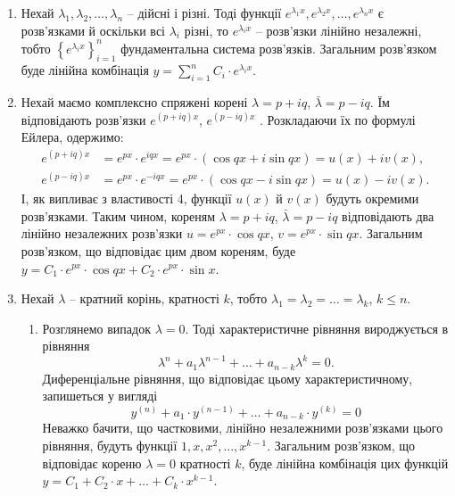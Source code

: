 \begin{enumerate}
\item Нехай $\lambda_1, \lambda_2, \ldots, \lambda_n$ -- дійсні і різні. Тоді функції $e^{\lambda_1 x}, e^{\lambda_2 x}, \ldots, e^{\lambda_n x}$ є розв’язками й оскільки всі $\lambda_i$ різні, то $e^{\lambda_i x}$ -- розв’язки лінійно незалежні, тобто $\left\{ e^{\lambda_i x} \right\}_{i = 1}^n$ фундаментальна система розв’язків. Загальним розв’язком буде лінійна комбінація $y = \sum_{i=1}^n C_i \cdot e^{\lambda_i x}$.
\item Нехай маємо комплексно спряжені корені $\lambda=p+iq$, $\bar\lambda=p-iq$. Їм відповідають розв’язки $e^{(p+iq)x}$, $e^{(p-iq)x}$ . Розкладаючи їх по формулі Ейлера, одержимо: 
\begin{align*}
	e^{(p+iq)x} &= e^{px} \cdot e^{iqx} = e^{px} \cdot (\cos qx + i \sin qx) = u(x) + i v(x), \\
	e^{(p-iq)x} &= e^{px} \cdot e^{-iqx} = e^{px} \cdot (\cos qx - i \sin qx) = u(x) - i v(x).
\end{align*}
І, як випливає з властивості 4, функції $u(x)$ й $v(x)$ будуть окремими розв’язками. Таким чином, кореням $\lambda = p + iq$, $\bar\lambda = p - iq$ відповідають два лінійно незалежних розв’язки $u = e^{px} \cdot \cos qx$, $v = e^{px} \cdot \sin qx$. Загальним розв’язком, що відповідає цим двом кореням, буде $y = C_1 \cdot e^{px} \cdot \cos qx + C_2 \cdot e^{px} \cdot \sin x$.
\item Нехай $\lambda$ -- кратний корінь, кратності $k$, тобто $\lambda_1 = \lambda_2 = \ldots = \lambda_k$, $k\le n$.
\begin{enumerate}
\item Розглянемо випадок $\lambda=0$. Тоді характеристичне рівняння вироджується в рівняння
\begin{equation*}
	\lambda^n + a_1 \lambda^{n - 1} + \ldots + a_{n - k} \lambda^k = 0.
\end{equation*}
 	Диференціальне рівняння, що відповідає цьому характеристичному, запишеться у вигляді
\begin{equation*}
	y^{(n)} + a_1 \cdot y^{(n - 1)} + \ldots + a_{n-k} \cdot y^{(k)} = 0
\end{equation*}
 	Неважко бачити, що частковими, лінійно незалежними роз\-в’я\-з\-ка\-ми цього рівняння, будуть функції $1, x, x^2, \ldots, x^{k-1}$. Загальним роз\-в’я\-з\-ком, що відповідає кореню $\lambda=0$ кратності $k$, буде лінійна комбінація цих функцій $y = C_1 + C_2 \cdot x + \ldots + C_k \cdot x^{k - 1}$.

\end{enumerate}
\end{enumerate}
